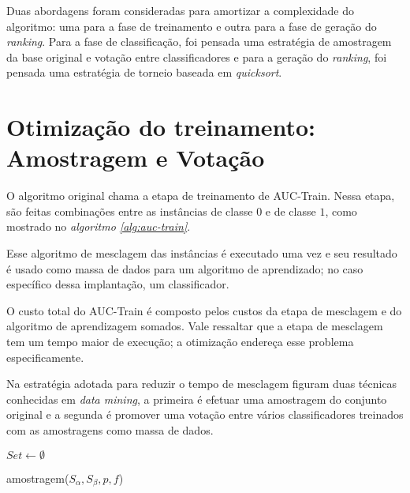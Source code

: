 Duas abordagens foram consideradas para amortizar a complexidade do algoritmo: uma para a fase de treinamento e outra para a fase de geração do \emph{ranking}. Para a fase de classificação, foi pensada uma estratégia de amostragem da base original e votação entre classificadores e para a geração do \emph{ranking}, foi pensada uma estratégia de torneio baseada em \emph{quicksort}.

\section{Otimização do treinamento: Amostragem e Votação}
O algoritmo original chama a etapa de treinamento de AUC-Train. Nessa etapa, são feitas combinações entre as instâncias de classe $0$ e de classe $1$, como mostrado no \emph{algoritmo \ref{alg:auc-train}}.

Esse algoritmo de mesclagem das instâncias é executado uma vez e seu resultado é usado como massa de dados para um algoritmo de aprendizado; no caso específico dessa implantação, um classificador.

O custo total do AUC-Train é composto pelos custos da etapa de mesclagem e do algoritmo de aprendizagem somados. Vale ressaltar que a etapa de mesclagem tem um tempo maior de execução; a otimização endereça esse problema especificamente.

Na estratégia adotada para reduzir o tempo de mesclagem figuram duas técnicas conhecidas em \emph{data mining}, a primeira é efetuar uma amostragem do conjunto original e a segunda é promover uma votação entre vários classificadores treinados com as amostragens como massa de dados.

\begin{function}

    $Set \gets \emptyset$\;
    


    \caption{amostragem($S_{\alpha}, S_{\beta}, p, f$)}
    \label{func:amostragem}
\end{function}

